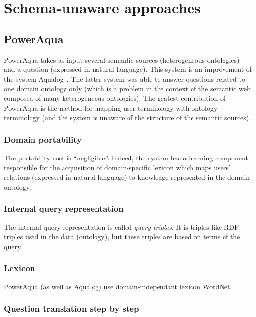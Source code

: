 \documentclass[10pt,journal,letterpaper,compsoc]{IEEEtran}
\begin{document}
\section{Schema-unaware approaches}
\label{sec:schema-unaware-details}

\subsection{{\sc PowerAqua}~\cite{DBLP:conf/esws/LopezMU06}}
{\sc PowerAqua} takes as input several semantic sources (heterogeneous
ontologies) and a question (expressed in natural language).
This system is an improvement of the system {\sc
Aqualog}~\cite{Garcia:2006:AOQ:1225785.1225790}. The latter system was able to
answer questions related to one domain ontology only (which is a problem in the
context of the semantic web composed of many heterogeneous ontologies).
The geatest contribution of {\sc PowerAqua} is the method for mapping user
terminology with ontology terminology (and the system is unaware of the
structure of the semantic sources).

\subsubsection{Domain portability}
The portability cost is ``negligible''.
Indeed, the system has a learning component responsible for the acquisition of
domain-specific lexicon which maps users' relations (expressed in natural
language) to knowledge represented in the domain ontology.

\subsubsection{Internal query representation}
The internal query representation is called {\it query triples}. It is triples
like RDF triples used in the data (ontology), but these triples are based on
terms of the query.

\subsubsection{Lexicon}
{\sc PowerAqua} (as well as {\sc Aqualog}) use domain-independant lexicon
WordNet. 

\subsubsection{Question translation step by step}
\end{document}
